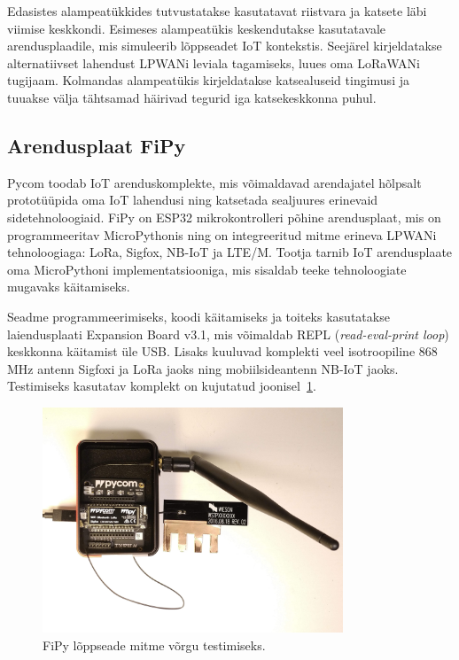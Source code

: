 \documentclass[12pt]{article}
\begin{document}
    Edasistes alampeatükkides tutvustatakse kasutatavat riistvara ja katsete läbi viimise keskkondi.
    Esimeses alampeatükis keskendutakse kasutatavale arendusplaadile, mis simuleerib lõppseadet IoT kontekstis.
    Seejärel kirjeldatakse alternatiivset lahendust LPWANi leviala tagamiseks, luues oma LoRaWANi tugijaam.
    Kolmandas alampeatükis kirjeldatakse katsealuseid tingimusi ja tuuakse välja tähtsamad häirivad tegurid iga katsekeskkonna puhul.

    \subsection{Arendusplaat FiPy}

    Pycom toodab IoT arenduskomplekte, mis võimaldavad arendajatel hõlpsalt prototüüpida oma IoT lahendusi ning katsetada sealjuures erinevaid sidetehnoloogiaid.
    FiPy on ESP32 mikrokontrolleri põhine arendusplaat, mis on programmeeritav MicroPythonis ning on integreeritud mitme erineva LPWANi tehnoloogiaga: LoRa, Sigfox, NB-IoT ja LTE\-/M.
    Tootja tarnib IoT arendusplaate oma MicroPythoni implementatsiooniga, mis sisaldab teeke tehnoloogiate mugavaks käitamiseks.

    Seadme programmeerimiseks, koodi käitamiseks ja toiteks kasutatakse laiendusplaati Expansion Board v3.1, mis võimaldab REPL (\textit{read-eval-print loop}) keskkonna käitamist üle USB.
    Lisaks kuuluvad komplekti veel isotroopiline 868 MHz antenn Sigfoxi ja LoRa jaoks ning mobiilsideantenn NB-IoT jaoks.
    Testimiseks kasutatav komplekt on kujutatud joonisel~\ref{fig:fipy}.

    \begin{figure} [ht] %
        \begin{center}
            \includegraphics[width=0.8\textwidth]{figures/fipy.jpg}
            \caption{FiPy lõppseade mitme võrgu testimiseks.}
            \label{fig:fipy}
        \end{center}
    \end{figure}
\end{document}
